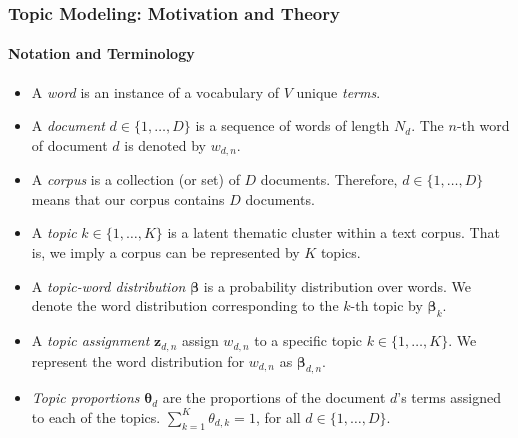 \documentclass[xcolor=dvipsnames]{beamer}
\begin{document}
\begin{frame}
\frametitle{Topic Modeling: Motivation and Theory}
\framesubtitle{Notation and Terminology}
\begin{itemize}
\item A \textit{word} is an instance of a vocabulary of $V$ unique \textit{terms}.
\item A \textit{document} $d \in \{1,\dots,D\}$ is a sequence of words of length $N_{d}$. The $n$-th word of document $d$ is denoted by $w_{d,n}$.
\item A \textit{corpus} is a collection (or set) of $D$ documents. Therefore, $d \in \{1,\dots,D\}$ means that our corpus contains $D$ documents.
\item A \textit{topic} $k \in \{1,\dots,K\}$ is a latent thematic cluster within a text corpus. That is, we imply a corpus can be represented by $K$ topics.
\item A \textit{topic-word distribution} $\boldsymbol{\beta}$ is a probability distribution over words. We denote the word distribution corresponding to the $k$-th topic by $\boldsymbol{\beta}_k$.
\item A \textit{topic assignment} $\boldsymbol{z}_{d,n}$ assign $w_{d,n}$ to a specific topic $k \in \{1,\dots,K\}$. We represent the word distribution for $w_{d,n}$ as $\boldsymbol{\beta}_{d,n}$.
\item \textit{Topic proportions} $\boldsymbol{\theta}_d$ are the proportions of the document $d$'s terms assigned to each of the topics. $\sum_{k=1}^{K}\theta_{d,k}=1$, for all $d \in \{1,\dots,D\}$.
\end{itemize}
\end{frame}
\end{document}

